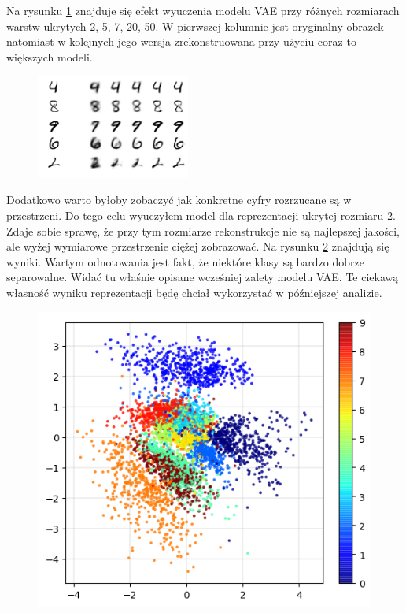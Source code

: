 Na rysunku \ref{fig:mnist_recon} znajduje się efekt wyuczenia modelu VAE przy różnych rozmiarach warstw ukrytych 2, 5, 7, 20, 50. W pierwszej kolumnie jest oryginalny obrazek natomiast w kolejnych jego wersja zrekonstruowana przy użyciu coraz to większych modeli.

\begin{figure}[h!]
    \centering
    \includegraphics[width=0.45\textwidth]{images/mnist_recon_v2}
    \caption{}
    \label{fig:mnist_recon}
\end{figure}

Dodatkowo warto byłoby zobaczyć jak konkretne cyfry rozrzucane są w przestrzeni. Do tego celu wyuczyłem model dla reprezentacji ukrytej rozmiaru 2. Zdaje sobie sprawę, że przy tym rozmiarze rekonstrukcje nie są najlepszej jakości, ale wyżej wymiarowe przestrzenie ciężej zobrazować. Na rysunku \ref{fig:mnist_2d} znajdują się wyniki. Wartym odnotowania jest fakt, że niektóre klasy są bardzo dobrze separowalne. Widać tu właśnie opisane wcześniej zalety modelu VAE. Te ciekawą własność wyniku reprezentacji będę chciał wykorzystać w późniejszej analizie.

\begin{figure}[h!]
    \centering
    \includegraphics[width=1.\textwidth]{images/mnist_2d}
    \caption{}
    \label{fig:mnist_2d}
\end{figure}

